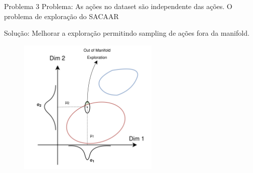 \begin{frame}{Problema 3}
    Problema: As ações no dataset são independente das ações. O problema de exploração do SACAAR

    Solução: Melhorar a exploração permitindo sampling de ações fora da manifold. 
    \begin{figure}
        \centering
        \vspace{-10pt}
        \includegraphics[width=0.6\textwidth]{img/sacaar_exp_man.png}
    \end{figure}
\end{frame}